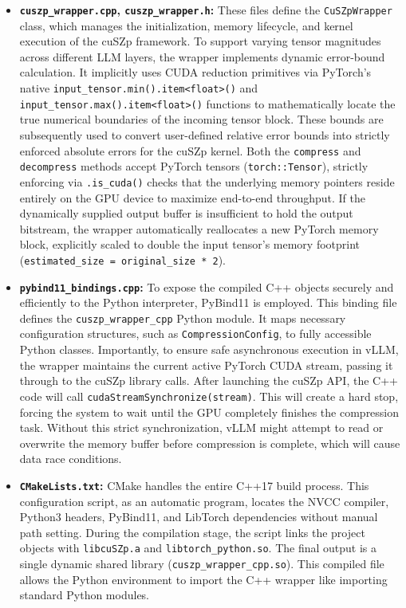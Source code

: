 \documentclass{polyu-comp}
\begin{document}
\begin{itemize}
    \item \textbf{\texttt{cuszp\_wrapper.cpp}, \texttt{cuszp\_wrapper.h}:} These files define the \texttt{CuSZpWrapper} class, which manages the initialization, memory lifecycle, and kernel execution of the cuSZp framework. To support varying tensor magnitudes across different LLM layers, the wrapper implements dynamic error-bound calculation. It implicitly uses CUDA reduction primitives via PyTorch's native \texttt{input\_tensor.min().item<float>()} and \texttt{input\_tensor.max().item<float>()} functions to mathematically locate the true numerical boundaries of the incoming tensor block. These bounds are subsequently used to convert user-defined relative error bounds into strictly enforced absolute errors for the cuSZp kernel. Both the \texttt{compress} and \texttt{decompress} methods accept PyTorch tensors (\texttt{torch::Tensor}), strictly enforcing via \texttt{.is\_cuda()} checks that the underlying memory pointers reside entirely on the GPU device to maximize end-to-end throughput. If the dynamically supplied output buffer is insufficient to hold the output bitstream, the wrapper automatically reallocates a new PyTorch memory block, explicitly scaled to double the input tensor's memory footprint (\texttt{estimated\_size = original\_size * 2}).
    
    \item \textbf{\texttt{pybind11\_bindings.cpp}:} To expose the compiled C++ objects securely and efficiently to the Python interpreter, PyBind11 is employed. This binding file defines the \texttt{cuszp\_wrapper\_cpp} Python module. It maps necessary configuration structures, such as \texttt{CompressionConfig}, to fully accessible Python classes. Importantly, to ensure safe asynchronous execution in vLLM, the wrapper maintains the current active PyTorch CUDA stream, passing it through to the cuSZp library calls. After launching the cuSZp API, the C++ code will call \texttt{cudaStreamSynchronize(stream)}. This will create a hard stop, forcing the system to wait until the GPU completely finishes the compression task. Without this strict synchronization, vLLM might attempt to read or overwrite the memory buffer before compression is complete, which will cause data race conditions.
    
    \item \textbf{\texttt{CMakeLists.txt}:} CMake handles the entire C++17 build process. This configuration script, as an automatic program, locates the NVCC compiler, Python3 headers, PyBind11, and LibTorch dependencies without manual path setting. During the compilation stage, the script links the project objects with \texttt{libcuSZp.a} and \texttt{libtorch\_python.so}. The final output is a single dynamic shared library (\texttt{cuszp\_wrapper\_cpp.so}). This compiled file allows the Python environment to import the C++ wrapper like importing standard Python modules.
\end{itemize}
\end{document}
